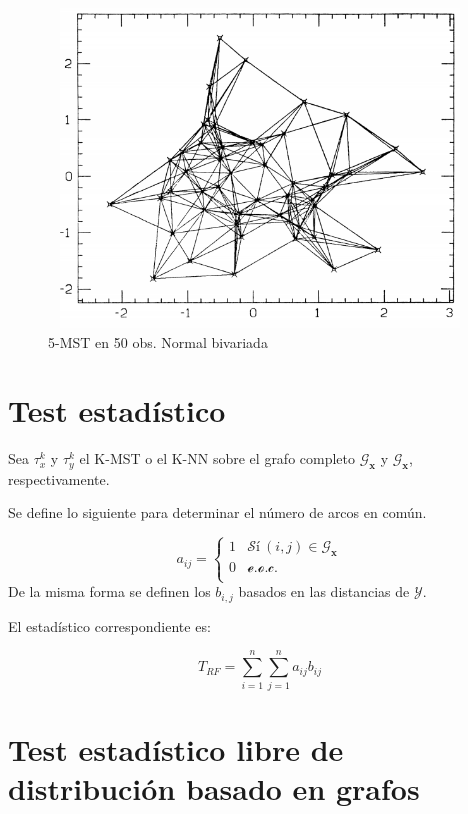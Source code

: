 \documentclass[]{book}
\begin{document}
\begin{figure}

{\centering \includegraphics[width=450,height=320]{5-MST} 

}

\caption{5-MST en 50 obs. Normal bivariada}\label{fig:unnamed-chunk-8}
\end{figure}

\section{Test estadístico}\label{test-estadistico}

Sea \(\tau_x^k\) y \(\tau_y^k\) el K-MST o el K-NN sobre el grafo
completo \(\mathcal{G}_{\mathbf{x}}\) y \(\mathcal{G}_{\mathbf{x}}\),
respectivamente.

Se define lo siguiente para determinar el número de arcos en común.

\[a_{ij}=  \left\{
  \begin{array}{ll}
 1 &  \mathcal{Sí} \ (i,j)\in \mathcal{G}_{\mathbf{x}}  \\
 0 &  \mathcal{e.o.c.} \\ 
 \end{array}
\right.
\] De la misma forma se definen los \(b_{i,j}\) basados en las
distancias de \(\mathcal{Y}\).

El estadístico correspondiente es:

\[T_{RF} = \displaystyle \sum_{i=1}^n \sum_{j=1}^n a_{ij}b_{ij}\]

\section{Test estadístico libre de distribución basado en
grafos}\label{test-estadistico-libre-de-distribucion-basado-en-grafos}
\end{document}
